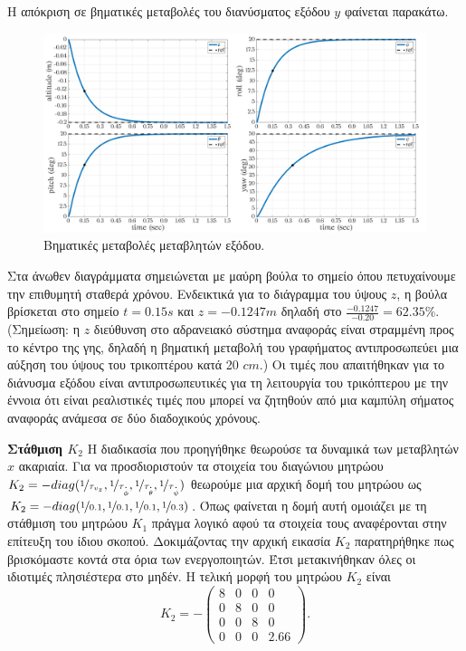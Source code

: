 Η απόκριση σε βηματικές μεταβολές του διανύσματος εξόδου $y$ φαίνεται παρακάτω.
\begin{figure}[H]
    \centering
    \includegraphics[width=1\textwidth]{Control/Nominal/fig_testeig.png}
    \caption{Βηματικές μεταβολές μεταβλητών εξόδου.}\label{fig:testig}
\end{figure}
Στα άνωθεν διαγράμματα σημειώνεται με μαύρη βούλα το σημείο όπου πετυχαίνουμε 
την επιθυμητή σταθερά χρόνου. Ενδεικτικά για το διάγραμμα του ύψους $z$, η βούλα
βρίσκεται στο σημείο $t = 0.15s$ και $z = -0.1247m$ δηλαδή στο $\frac
{-0.1247}{-0.20} = 62.35 \%$. (Σημείωση: η $z$ διεύθυνση στο αδρανειακό σύστημα 
αναφοράς είναι στραμμένη προς το κέντρο της γης, δηλαδή η βηματική μεταβολή του
γραφήματος αντιπροσωπεύει μια αύξηση του ύψους του τρικοπτέρου κατά 20 $\si{cm}$.)
Οι τιμές που απαιτήθηκαν για το διάνυσμα εξόδου είναι αντιπροσωπευτικές για 
τη λειτουργία του τρικόπτερου με την έννοια ότι είναι ρεαλιστικές τιμές που 
μπορεί να ζητηθούν από μια καμπύλη σήματος αναφοράς ανάμεσα σε δύο διαδοχικούς 
χρόνους.

\textbf{Στάθμιση $K_2$} Η διαδικασία που προηγήθηκε θεωρούσε τα δυναμικά 
των μεταβλητών $x$ ακαριαία. Για να προσδιοριστούν τα στοιχεία του διαγώνιου 
μητρώου $K_2 = -diag(\nicefrac{1}{\tau_{v_z}}, \nicefrac{1}{\tau_{\dot{\phi}}},
\nicefrac{1}{\tau_{\dot{\theta}}},\nicefrac{1}{\tau_{\dot{\psi}}})$ θεωρούμε μια 
αρχική δομή του μητρώου ως $K_2 = -diag(\nicefrac{1}{0.1}, \nicefrac{1}{0.1},
\nicefrac{1}{0.1},\nicefrac{1}{0.3})$. Όπως φαίνεται η δομή αυτή ομοιάζει με τη
στάθμιση του μητρώου $K_1$ πράγμα λογικό αφού τα στοιχεία τους αναφέρονται στην
επίτευξη του ίδιου σκοπού. Δοκιμάζοντας την αρχική εικασία $K_2$ παρατηρήθηκε 
πως βρισκόμαστε κοντά στα όρια των ενεργοποιητών. Έτσι μετακινήθηκαν όλες οι 
ιδιοτιμές πλησιέστερα στο μηδέν. Η τελική μορφή του μητρώου $K_2$ είναι
\begin{equation*}
    K_2 = -
    \begin{pmatrix}
        8 & 0 & 0 & 0\\
        0 & 8 & 0 & 0\\
        0 & 0 & 8 & 0\\
        0 & 0 & 0 & 2.66
    \end{pmatrix}.
\end{equation*}

